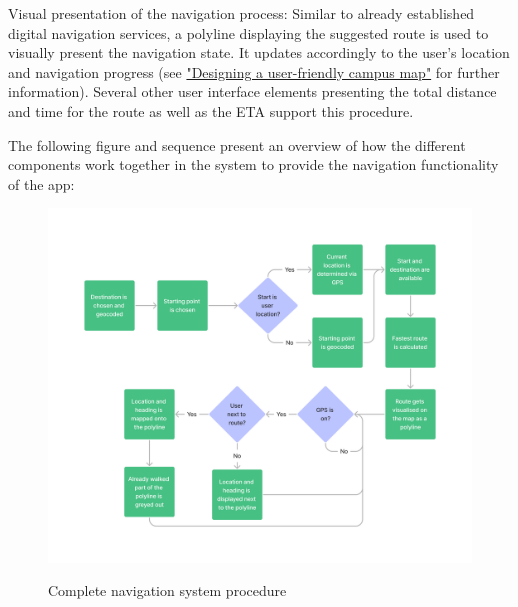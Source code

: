 \newpage

Visual presentation of the navigation process: Similar to already established digital navigation services, a polyline displaying the suggested route is used to visually present the navigation state. It updates accordingly to the user's location and navigation progress (see \hyperref[sub:campus_user_experience]{"Designing a user-friendly campus map"} for further information). Several other user interface elements presenting the total distance and time for the route as well as the ETA support this procedure.

The following figure and sequence present an overview of how the different components work together in the system to provide the navigation functionality of the app:

\begin{figure}[!ht]
	\centering
	\includegraphics[width=1.0\textwidth]{images/navigation_process.png}\\
	\caption{Complete navigation system procedure}
    \label{fig:navigation_system}
\end{figure}

